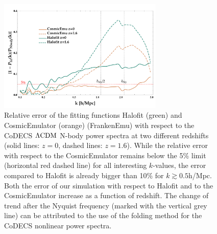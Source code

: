 \begin{figure}
\centering{}
\includegraphics[width=0.7\textwidth]{Chapters/fitting-funcs/figures/emulatorHalofitNbodyPkErrors-v7}\protect\protect\caption[Relative error of the fitting
functions Halofit and CosmicEmulator
with respect to the CoDECS $\lcdm$ N-body power spectra.]{\label{fig:Error-comp-Halofit-CosmicEmu} Relative error of the fitting
functions Halofit (green) and CosmicEmulator (orange) (FrankenEmu)
with respect to the CoDECS $\protect\Lambda\mathrm{CDM}$ N-body power spectra at
two different redshifts (solid lines: $z=0$, dashed lines: $z=1.6$).
While the relative error with respect to the CosmicEmulator remains
below the 5\% limit (horizontal red dashed line) for all interesting
$k$-values, the error compared to Halofit is already bigger than
10\% for $k \gtrsim 0.5$h/Mpc. Both the error of our simulation with
respect to Halofit and to the CosmicEmulator increase as a function
of redshift. The change of trend after the Nyquist frequency (marked
with the vertical grey line) can be attributed to the use of the folding
method for the CoDECS nonlinear power spectra.}
\end{figure}


